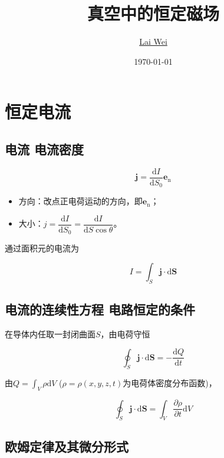 \documentclass[12pt]{article}
\title{真空中的恒定磁场}
\author{\href{mailto:lai-wei@whu.edu.cn}{Lai Wei}}
\date{\today}
\newcommand{\rmd}{\mathrm{d}}
\newcommand{\deriv}[2]{\frac{\rmd #1}{\rmd #2}}
\newcommand{\pderiv}[2]{\frac{\partial #1}{\partial #2}}
\newcommand{\dderiv}[2]{\dfrac{\rmd #1}{\rmd #2}}
\begin{document}
\maketitle

\section{恒定电流}

\subsection{电流 \quad 电流密度}

\begin{equation}
    \boldsymbol{j} = \deriv{I}{S_0} \boldsymbol{e}_{\text{n}}
\end{equation}

\begin{itemize}
    \item 方向：改点正电荷运动的方向，即$\boldsymbol{e}_{\text{n}}$；
    \item 大小：$j = \dderiv{I}{S_0} = \dderiv{I}{S \cos \theta}$。
\end{itemize}

通过面积元的电流为

\begin{equation}
    I = \int_S \boldsymbol{j} \cdot \rmd \boldsymbol{S}
\end{equation}

\subsection{电流的连续性方程 \quad 电路恒定的条件}

在导体内任取一封闭曲面$S$，由电荷守恒

\begin{equation}
    \oint_S \boldsymbol{j} \cdot \rmd \boldsymbol{S} = - \deriv{Q}{t}
\end{equation}

由$Q = \int_V \rho \rmd V$ ($\rho = \rho(x,y,z,t)$为电荷体密度分布函数)，

\begin{equation}
    \oint_S \boldsymbol{j} \cdot \rmd \boldsymbol{S} = \int_V \pderiv{\rho}{t} \rmd V
\end{equation}

\subsection{欧姆定律及其微分形式}
\end{document}
